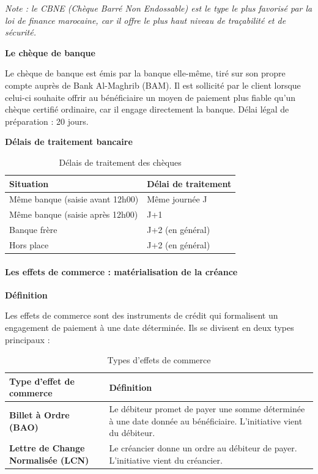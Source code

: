 \textit{Note : le CBNE (Chèque Barré Non Endossable) est le type le plus favorisé par la loi de finance marocaine, car il offre le plus haut niveau de traçabilité et de sécurité.}

\medskip\textbf{Le chèque de banque}

Le chèque de banque est émis par la banque elle-même, tiré sur son propre compte auprès de Bank Al-Maghrib (BAM). Il est sollicité par le client lorsque celui-ci souhaite offrir au bénéficiaire un moyen de paiement plus fiable qu'un chèque certifié ordinaire, car il engage directement la banque. Délai légal de préparation : 20 jours.

\medskip\textbf{Délais de traitement bancaire}

\begin{table}[h!]
\centering
\begin{tabularx}{\textwidth}{X X}
\toprule
Situation & Délai de traitement \\
\midrule
Même banque (saisie avant 12h00) & Même journée J \\
Même banque (saisie après 12h00) & J+1 \\
Banque frère & J+2 (en général) \\
Hors place & J+2 (en général) \\
\bottomrule
\end{tabularx}
\caption{Délais de traitement des chèques}
\end{table}

\paragraph{Les effets de commerce : matérialisation de la créance}

\medskip\textbf{Définition}

Les effets de commerce sont des instruments de crédit qui formalisent un engagement de paiement à une date déterminée. Ils se divisent en deux types principaux :

\begin{table}[h!]
\centering
\begin{tabularx}{\textwidth}{>{\bfseries}l X}
\toprule
Type d'effet de commerce & Définition \\
\midrule
Billet à Ordre (BAO) & Le débiteur promet de payer une somme déterminée à une date donnée au bénéficiaire. L'initiative vient du débiteur. \\
\addlinespace
Lettre de Change Normalisée (LCN) & Le créancier donne un ordre au débiteur de payer. L'initiative vient du créancier. \\
\bottomrule
\end{tabularx}
\caption{Types d'effets de commerce}
\end{table}

